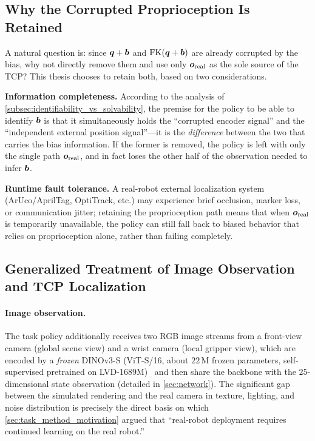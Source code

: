 \subsection{Why the Corrupted Proprioception Is Retained}\label{subsec:obs_keep_contam}

A natural question is: since $\bm{q}+\bm{b}$ and $\text{FK}(\bm{q}+\bm{b})$ are already corrupted by the bias, why not directly remove them and use only $\bm{o}_\text{real}$ as the sole source of the TCP? This thesis chooses to retain both, based on two considerations.

\textbf{Information completeness.} According to the analysis of \cref{subsec:identifiability_vs_solvability}, the premise for the policy to be able to identify $\bm{b}$ is that it simultaneously holds the ``corrupted encoder signal'' and the ``independent external position signal''---it is the \emph{difference} between the two that carries the bias information. If the former is removed, the policy is left with only the single path $\bm{o}_\text{real}$, and in fact loses the other half of the observation needed to infer $\bm{b}$.

\textbf{Runtime fault tolerance.} A real-robot external localization system (ArUco/AprilTag, OptiTrack, etc.) may experience brief occlusion, marker loss, or communication jitter; retaining the proprioception path means that when $\bm{o}_\text{real}$ is temporarily unavailable, the policy can still fall back to biased behavior that relies on proprioception alone, rather than failing completely.

\subsection{Generalized Treatment of Image Observation and TCP Localization}\label{subsec:obs_image_tcp}

\paragraph{Image observation.} The task policy additionally receives two RGB image streams from a front-view camera (global scene view) and a wrist camera (local gripper view), which are encoded by a \emph{frozen} DINOv3-S (ViT-S/16, about $22$\,M frozen parameters, self-supervised pretrained on LVD-1689M)~\cite{simeoni2025dinov3} and then share the backbone with the $25$-dimensional state observation (detailed in \cref{sec:network}). The significant gap between the simulated rendering and the real camera in texture, lighting, and noise distribution is precisely the direct basis on which \cref{sec:task_method_motivation} argued that ``real-robot deployment requires continued learning on the real robot.''

